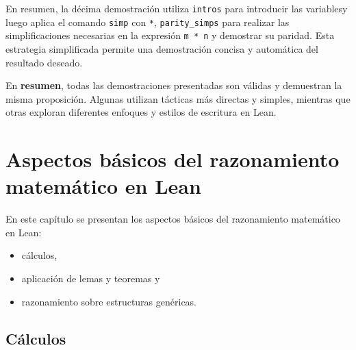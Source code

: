 En resumen, la décima demostración utiliza \texttt{intros} para introducir las
variablesy luego aplica el comando \texttt{simp} con \texttt{*}, \texttt{parity\_simps} para
realizar las simplificaciones necesarias en la expresión \texttt{m * n} y
demostrar su paridad. Esta estrategia simplificada permite una
demostración concisa y automática del resultado deseado.

En \textbf{resumen}, todas las demostraciones presentadas son válidas y
demuestran la misma proposición. Algunas utilizan tácticas más directas
y simples, mientras que otras exploran diferentes enfoques y estilos de
escritura en Lean.

\chapter{Aspectos básicos del razonamiento matemático en Lean}
\label{sec:org8b3c320}

En este capítulo se presentan los aspectos básicos del razonamiento matemático
en Lean:
\begin{itemize}
\item cálculos,
\item aplicación de lemas y teoremas y
\item razonamiento sobre estructuras genéricas.
\end{itemize}

\section{Cálculos}
\label{sec:orgc0ecb7d}

